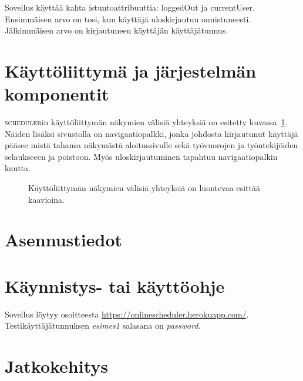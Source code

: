 \documentclass[10pt,titlepage,hidelinks]{scrartcl}
\newcommand{\scheduler}{\textsc{scheduler}}
\begin{document}
Sovellus käyttää kahta istuntoattribuuttia: loggedOut ja currentUser. Ensimmäisen arvo on tosi, kun käyttäjä uloskirjautuu onnistuneesti. Jälkimmäisen arvo on kirjautuneen käyttäjän käyttäjätunnus.

\section{Käyttöliittymä ja järjestelmän komponentit}

\scheduler{}in käyttöliittymän näkymien välisiä yhteyksiä on esitetty kuvassa~\ref{fig:nakymat}. Näiden lisäksi sivustolla on navigaatiopalkki, jonka johdosta kirjautunut käyttäjä pääsee mistä tahansa näkymästä aloitussivulle sekä työvuorojen ja työntekijöiden selaukseeen ja poistoon. Myös uloskirjautuminen tapahtuu navigaatiopalkin kautta.

\begin{figure}[tb]
\centering
{}
\caption{Käyttöliittymän näkymien välisiä yhteyksiä on luontevaa esittää kaavioina.}
\label{fig:nakymat}
\end{figure}

\section{Asennustiedot}


\section{Käynnistys- tai käyttöohje}
Sovellus löytyy osoitteesta \url{https://onlinescheduler.herokuapp.com/}. Testikäyttäjätunnuksen \emph{esimes1} salasana on \emph{password}.

\section{Jatkokehitys}
\end{document}
